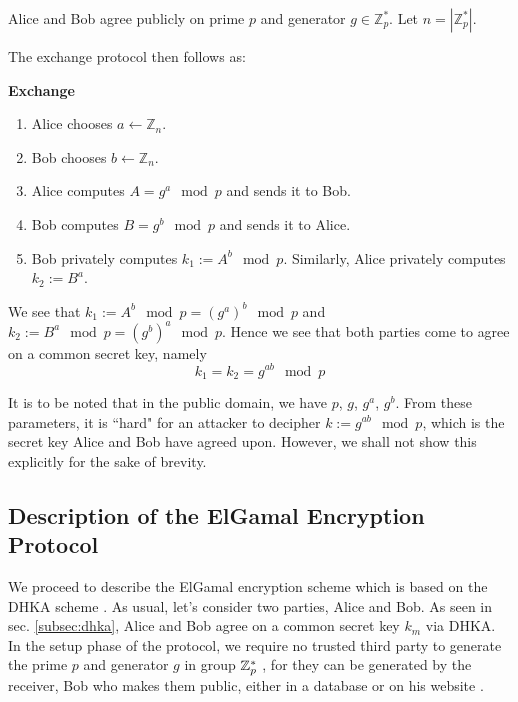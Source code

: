Alice and Bob agree publicly on prime \( p \) and generator \( g \in \mathbb{Z}^*_p \). 
Let \( n = |\mathbb{Z}^*_p| \).

The exchange protocol then follows as:

\begin{tcolorbox}
\textbf{Exchange} 
\begin{enumerate}
    \item Alice chooses \( a \leftarrow \mathbb{Z}_n \). 
    \item Bob chooses \( b \leftarrow \mathbb{Z}_n \).
    \item Alice computes \( A = g^a \mod p \) and sends it to Bob.
    \item Bob computes \( B = g^b \mod p \) and sends it to Alice.
    \item Bob privately computes \( k_1 := A^b \mod p \). Similarly, Alice privately computes \( k_2 := B^a \).
\end{enumerate}
\end{tcolorbox}

We see that \( k_1 := A^b \mod p = (g^a)^b \mod p \) and \( k_2 := B^a \mod p = (g^b)^a \mod p \). Hence we see that both parties come to agree on a common secret key, namely
\begin{equation}
    k_1 = k_2 = g^{ab} \mod p
\end{equation}

It is to be noted that in the public domain, we have \( p \), \( g \), \( g^a \), \( g^b \). 
From these parameters, it is ``hard" for an attacker to decipher \( k := g^{ab} \mod p\), which is the secret key Alice and Bob have agreed upon. 
However, we shall not show this explicitly for the sake of brevity.

\subsection{Description of the ElGamal Encryption Protocol}

We proceed to describe the ElGamal encryption scheme which is based on the DHKA scheme \cite{Elgamal_1985}. 
As usual, let's consider two parties, Alice and Bob. 
As seen in sec. \ref{subsec:dhka}, Alice and Bob agree on a common secret key \( k_m \) via DHKA.
In the setup phase of the protocol, we require no trusted third party to generate the prime \( p \) and generator \( g \) in group \( \mathbb{Z}^*_p \) , for they can be generated by the receiver, Bob who makes them public, either in a database or on his website \cite{paar2009understanding}.


